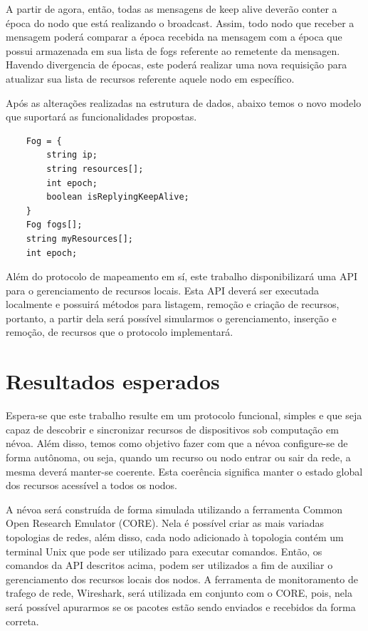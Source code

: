 A partir de agora, então, todas as mensagens de keep alive deverão conter a época do nodo que está realizando o broadcast.
Assim, todo nodo que receber a mensagem poderá comparar a época recebida na mensagem com a época que possui armazenada em sua lista de fogs referente ao remetente da mensagen.
Havendo divergencia de épocas, este poderá realizar uma nova requisição para atualizar sua lista de recursos referente aquele nodo em específico.

Após as alterações realizadas na estrutura de dados, abaixo temos o novo modelo que suportará as funcionalidades propostas.
\begin{verbatim}
    Fog = {
        string ip;
        string resources[];
        int epoch;
        boolean isReplyingKeepAlive;
    }
    Fog fogs[];
    string myResources[];
    int epoch;
\end{verbatim}

Além do protocolo de mapeamento em sí, este trabalho disponibilizará uma API para o gerenciamento de recursos locais.
Esta API deverá ser executada localmente e possuirá métodos para listagem, remoção e criação de recursos, portanto, a partir dela será possível
simularmos o gerenciamento, inserção e remoção, de recursos que o protocolo implementará.

\section{Resultados esperados}

Espera-se que este trabalho resulte em um protocolo funcional, simples e que seja capaz de descobrir e sincronizar recursos de dispositivos sob computação em névoa.
Além disso, temos como objetivo fazer com que a névoa configure-se de forma autônoma, ou seja, quando um recurso ou nodo entrar ou sair da rede, a mesma deverá manter-se coerente.
Esta coerência significa manter o estado global dos recursos acessível a todos os nodos.

A névoa será construída de forma simulada utilizando a ferramenta Common Open Research Emulator (CORE)\cite{coregui}. Nela é possível criar as mais variadas topologias de redes,
além disso, cada nodo adicionado à topologia contém um terminal Unix que pode ser utilizado para executar comandos. Então, os comandos da API descritos acima,
podem ser utilizados a fim de auxiliar o gerenciamento dos recursos locais dos nodos. A ferramenta de monitoramento de trafego de rede, Wireshark\cite{wireshark}, será utilizada em conjunto com o 
CORE, pois, nela será possível apurarmos se os pacotes estão sendo enviados e recebidos da forma correta.


